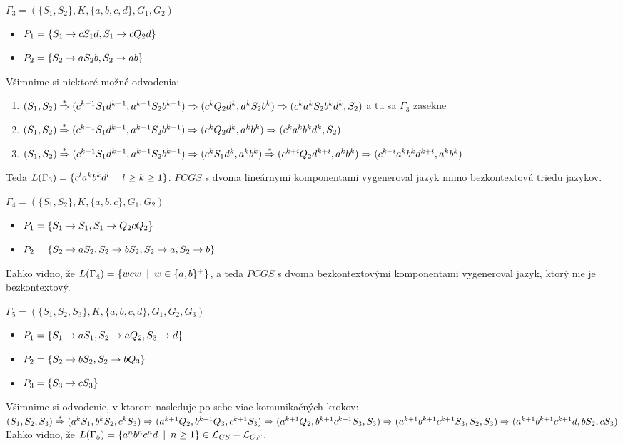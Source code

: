\begin{priklad}
  \label{pcgs_prikl_3} $\Gamma_3=(\{S_1,S_2\},K,\{a,b,c,d\},G_1,G_2)$
  \begin{itemize}
    \item $P_1=\{S_1\rightarrow cS_1d,S_1\rightarrow cQ_2d\}$
    \item $P_2=\{S_2\rightarrow aS_2b,S_2\rightarrow ab\}$
  \end{itemize}
  Všimnime si niektoré možné odvodenia:
  \begin{enumerate}
    \item $(S_1,S_2)\overset{*}{\Rightarrow}
    (c^{k-1}S_1d^{k-1},a^{k-1}S_2b^{k-1})\Rightarrow (c^kQ_2d^k,a^kS_2b^k)\Rightarrow
    (c^ka^kS_2b^kd^k,S_2)$ a tu sa $\Gamma_3$ zasekne
    \item $(S_1,S_2)\overset{*}{\Rightarrow}
    (c^{k-1}S_1d^{k-1},a^{k-1}S_2b^{k-1})\Rightarrow (c^kQ_2d^k,a^kb^k)\Rightarrow
    (c^ka^kb^kd^k,S_2)$
    \item $(S_1,S_2)\overset{*}\Ra
    (c^{k-1}S_1d^{k-1},a^{k-1}S_2b^{k-1})\Ra
    (c^kS_1d^k,a^kb^k)\overset{*}\Ra
    (c^{k+i}Q_2d^{k+i},a^kb^k)\Ra\newline
    (c^{k+i}a^kb^kd^{k+i},a^kb^k)$
  \end{enumerate}
  Teda $L(\Gamma_3)=\{c^la^kb^kd^l\enspace |\enspace l\geq k\geq 1\}$. $PCGS$ s
  dvoma lineárnymi komponentami vygeneroval jazyk mimo bezkontextovú
  triedu jazykov.
\end{priklad}

\begin{priklad}
  $\Gamma_4=(\{S_1,S_2\},K,\{a,b,c\},G_1,G_2)$
  \begin{itemize}
    \item $P_1=\{S_1\rightarrow S_1,S_1\rightarrow Q_2cQ_2\}$
    \item $P_2=\{S_2\rightarrow aS_2,S_2\rightarrow bS_2,S_2\rightarrow
    a,S_2\rightarrow b\}$
  \end{itemize}
  Ľahko vidno, že $L(\Gamma_4)=\{wcw\enspace |\enspace w\in\{a,b\}^+\}$, a teda
  $PCGS$ s dvoma bezkontextovými komponentami vygeneroval jazyk,
  ktorý nie je bezkontextový.
\end{priklad}

\begin{priklad}
  $\Gamma_5=(\{S_1,S_2,S_3\},K,\{a,b,c,d\},G_1,G_2,G_3)$
  \begin{itemize}
    \item $P_1=\{S_1\rightarrow aS_1,S_2\rightarrow aQ_2,S_3\rightarrow d\}$
    \item $P_2=\{S_2\rightarrow bS_2,S_2\rightarrow bQ_3\}$
    \item $P_3=\{S_3\rightarrow cS_3\}$
  \end{itemize}
  Všimnime si odvodenie, v ktorom nasleduje po sebe viac
  komunikačných krokov:
  \\ $(S_1,S_2,S_3)\overset{*}{\Rightarrow} (a^kS_1,b^kS_2,c^kS_3)\Rightarrow
  (a^{k+1}Q_2,b^{k+1}Q_3,c^{k+1}S_3)\Rightarrow
  (a^{k+1}Q_2,b^{k+1}c^{k+1}S_3,S_3)\Rightarrow
  (a^{k+1}b^{k+1}c^{k+1}S_3,S_2,S_3)\Rightarrow
  (a^{k+1}b^{k+1}c^{k+1}d,bS_2,cS_3)$ \\ Ľahko vidno, že
  $L(\Gamma_5)=\{a^nb^nc^nd\enspace |\enspace n\geq 1\}\in
  \mathcal{L}_{CS}-\mathcal{L}_{CF}$.
\end{priklad}

